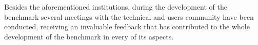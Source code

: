 \begin{figure}
\end{figure}

Besides the aforementioned institutions, during the development of the
benchmark several meetings with the technical and users community have been
conducted, receiving an invaluable feedback that has contributed to the whole
development of the benchmark in every of its aspects.

